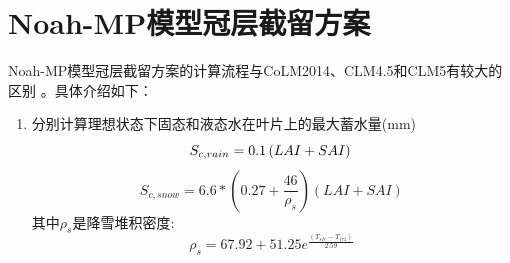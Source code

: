 \section{Noah-MP模型冠层截留方案}
Noah-MP模型冠层截留方案的计算流程与CoLM2014、CLM4.5和CLM5有较大的区别 \citet{niu2011community,he2023modernizing}。具体介绍如下：
\begin{enumerate}
\item 分别计算理想状态下固态和液态水在叶片上的最大蓄水量(mm)\\
\begin{equation}
S_{c,rain}=0.1\left(LAI+SAI\right)\\
\end{equation}
\begin{equation}
S_{c,snow}= 6.6*\left(0.27+{\frac{46}{\rho_{s}}}\right) \left(LAI+SAI\right)
\end{equation}
其中$\rho_{s}$是降雪堆积密度: 
\begin{equation}
\rho_{s}=67.92+51.25 e^{\frac{\left(T_{s f c}-T_{f r z}\right)}{2.59}}
\end{equation}


\end{enumerate}
